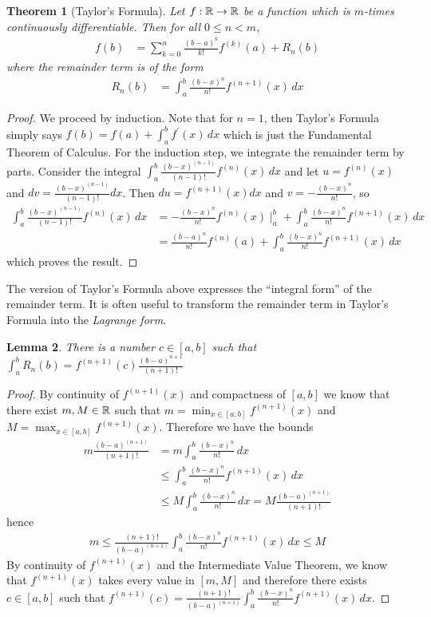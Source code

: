 \documentclass{amsart}
\newtheorem{thm}{Theorem}[section]
\newtheorem{lem}[thm]{Lemma}
\theoremstyle{remark}
\theoremstyle{definition}
\begin{document}
\begin{thm}[Taylor's Formula]\label{TaylorsTheorem}Let $f: \mathbb{R}\to
  \mathbb{R}$ be a function which is $m$-times continuously differentiable.  Then for all
  $0 \leq n < m$,
\begin{align*}
f(b) &= \sum_{k=0}^n \frac{(b-a)^k}{k!} f^{(k)}(a) + R_n(b)
\end{align*}
where the \emph{remainder term} is of the form
\begin{align*}
R_n(b) &= \int_a^b
\frac{(b-x)^n}{n!} f^{(n+1)}(x) \, dx
\end{align*}
\end{thm}
\begin{proof}
We proceed by induction.  Note that for $n=1$, then Taylor's Formula simply says $f(b) = f(a) +
\int_a^b f^\prime(x) \, dx$ which is just the Fundamental Theorem of
Calculus.  For the induction step, we integrate the remainder term by parts.  Consider
the integral $\int_a^b \frac{(b-x)^{(n-1)}}{(n-1)!} f^{(n)}(x) \, dx$ and let
$u = f^{(n)}(x)$ and $dv = \frac{(b-x)^{(n-1)}}{(n-1)!} dx$.  Then $du =
f^{(n+1)}(x) dx$ and $v = -\frac{(b-x)^n}{n!}$, so 
\begin{align*}
\int_a^b \frac{(b-x)^{(n-1)}}{(n-1)!} f^{(n)}(x) \, dx &=
-\frac{(b-x)^n}{n!} f^{(n)}(x) \mid_a^b + \int_a^b \frac{(b-x)^n}{n!}
f^{(n+1)}(x) \, dx \\
&= \frac{(b-a)^n}{n!} f^{(n)}(a) + \int_a^b \frac{(b-x)^n}{n!}
f^{(n+1)}(x) \, dx
\end{align*}
which proves the result.
\end{proof}
The version of Taylor's Formula above expresses the ``integral form''
of the remainder term.  It is often useful to transform the remainder term in Taylor's Formula
into the \emph{Lagrange form}.
\begin{lem}\label{LagrangeFormRemainder}There is a number $c \in
  [a,b]$ such that $\int_a^b
R_n(b)= f^{(n+1)}(c) \frac{(b-a)^{n+1}}{(n+1)!}$
\end{lem}
\begin{proof}
By continuity of $f^{(n+1)}(x)$ and compactness of $[a,b]$ we know
that there exist $m, M \in \mathbb{R}$ such that $m = \min_{x \in [a,b]}
f^{(n+1)}(x)$ and $M = \max_{x \in [a,b]}
f^{(n+1)}(x)$.
Therefore we have the bounds
\begin{align*}
m\frac{(b-a)^{(n+1)}}{(n+1)!} &= m \int_a^b
\frac{(b-x)^n}{n!} \, dx \\
&\leq \int_a^b
\frac{(b-x)^n}{n!} f^{(n+1)}(x) \, dx \\
&\leq M \int_a^b
\frac{(b-x)^n}{n!} \, dx = M\frac{(b-a)^{(n+1)}}{(n+1)!} 
\end{align*}
hence 
\begin{align*}
m \leq \frac {(n+1)!} {(b-a)^{(n+1)}}\int_a^b
\frac{(b-x)^n}{n!} f^{(n+1)}(x) \, dx \leq M
\end{align*}
By continuity of $f^{(n+1)}(x)$ and the Intermediate Value Theorem, we know that $f^{(n+1)}(x)$
takes every value in $[m,M]$ and therefore there exists $c \in [a,b]$
such that $f^{(n+1)}(c) = \frac {(n+1)!} {(b-a)^{(n+1)}}\int_a^b
\frac{(b-x)^n}{n!} f^{(n+1)}(x) \, dx$.
\end{proof}
\end{document}
